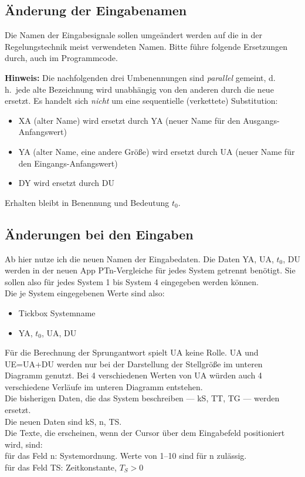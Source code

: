 \documentclass[main.tex]{subfiles}
\begin{document}
\subsection{Änderung der Eingabenamen}
Die Namen der Eingabesignale sollen umgeändert werden auf die in der Regelungstechnik meist verwendeten Namen. Bitte führe folgende Ersetzungen durch, auch im Programmcode.

\textbf{Hinweis:} Die nachfolgenden drei Umbenennungen sind \emph{parallel} gemeint,
d.\,h.\ jede alte Bezeichnung wird unabhängig von den anderen durch die neue ersetzt.
Es handelt sich \emph{nicht} um eine sequentielle (verkettete) Substitution:
\begin{itemize}
    \item XA (alter Name) wird ersetzt durch YA (neuer Name für den Ausgangs-Anfangswert)
    \item YA (alter Name, eine andere Größe) wird ersetzt durch UA (neuer Name für den Eingangs-Anfangswert)
    \item DY wird ersetzt durch DU  %
\end{itemize}
Erhalten bleibt in Benennung und Bedeutung $t_0$.

\subsection{Änderungen bei den Eingaben}
Ab hier nutze ich die neuen Namen der Eingabedaten.
Die Daten YA, UA, $t_0$, DU werden in der neuen App PTn-Vergleiche für jedes System getrennt benötigt. Sie sollen also für jedes System 1 bis System 4 eingegeben werden können.\\
Die je System eingegebenen Werte sind also:  %
\begin{itemize}
    \item Tickbox \quad Systemname
    \item YA, $t_0$, UA, DU
\end{itemize}
Für die Berechnung der Sprungantwort spielt UA keine Rolle. UA und UE=UA+DU werden nur bei der Darstellung der Stellgröße im unteren Diagramm genutzt. Bei 4 verschiedenen Werten von UA würden auch 4 verschiedene Verläufe im unteren Diagramm entstehen.\\
Die bisherigen Daten, die das System beschreiben — kS, TT, TG — werden ersetzt.\\
Die neuen Daten sind kS, n, TS.\\
Die Texte, die erscheinen, wenn der Cursor über dem Eingabefeld positioniert wird, sind:\\
für das Feld n: Systemordnung. Werte von 1–10 sind für n zulässig.\\
für das Feld TS: Zeitkonstante, $T_S > 0$  %
\end{document}

